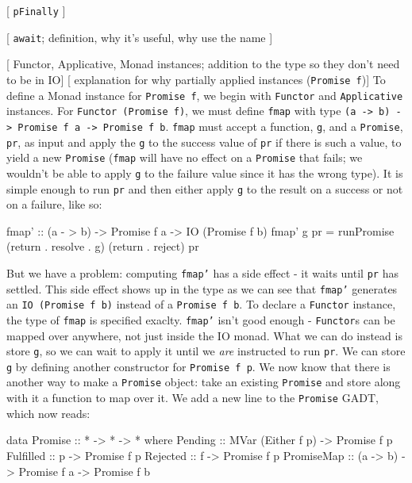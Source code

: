 \documentclass[12pt, english, letterpaper]{kuthesis}
\newcommand{\lit}[1]{\texttt{#1}}
\begin{document}
[ \lit{pFinally} ]

[ \lit{await}; definition, why it's useful, why use the name ]

[ Functor, Applicative, Monad instances; addition to the type so they don't need to be in IO]
[ explanation for why partially applied instances (\lit{Promise f})]
To define a Monad instance for \lit{Promise f}, we begin with \lit{Functor} and \lit{Applicative} instances.  For \lit{Functor (Promise f)}, we must define \lit{fmap} with type \lit{(a -> b) -> Promise f a -> Promise f b}.  \lit{fmap} must accept a function, \lit g, and a \lit{Promise}, \lit{pr}, as input and apply the \lit g to the success value of \lit{pr} if there is such a value, to yield a new \lit{Promise} (\lit{fmap} will have no effect on a \lit{Promise} that fails; we wouldn't be able to apply \lit g to the failure value since it has the wrong type).  It is simple enough to run \lit{pr} and then either apply \lit g to the result on a success or not on a failure, like so:
\begin{code}
  fmap' :: (a - > b) -> Promise f a -> IO (Promise f b)
  fmap' g pr = runPromise (return . resolve . g) (return . reject) pr
\end{code}
But we have a problem: computing \lit{fmap'} has a side effect - it waits until \lit{pr} has settled.  This side effect shows up in the type as we can see that \lit{fmap'} generates an \lit{IO (Promise f b)} instead of a \lit{Promise f b}.  To declare a \lit{Functor} instance, the type of \lit{fmap} is specified exaclty.  \lit{fmap'} isn't good enough  - \lit{Functor}s can be mapped over anywhere, not just inside the IO monad.  What we can do instead is store \lit g, so we can wait to apply it until we \emph{are} instructed to run \lit{pr}.  We can store \lit g by defining another constructor for \lit{Promise f p}.  We now know that there is another way to make a \lit{Promise} object: take an existing \lit{Promise} and store along with it a function to map over it.  We add a new line to the \lit{Promise} GADT, which now reads:
\begin{code}
data Promise :: * -> * -> * where
    Pending :: MVar (Either f p) -> Promise f p
    Fulfilled :: p -> Promise f p
    Rejected :: f -> Promise f p
    PromiseMap :: (a -> b) -> Promise f a -> Promise f b
\end{code}
\end{document}
